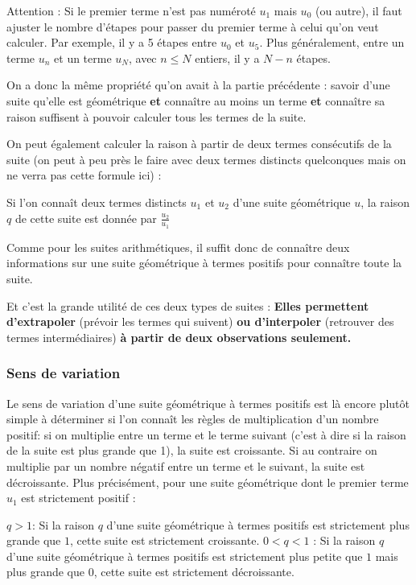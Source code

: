 \documentclass[10pt,a4paper]{book}
\begin{document}
\vspace{20 mm}

Attention : Si le premier terme n'est pas numéroté $u_1$ mais $u_0$ (ou autre), il faut ajuster le nombre d'étapes pour passer du premier terme à celui qu'on veut calculer.  Par exemple, il y a 5 étapes entre $u_0$ et $u_5$. Plus généralement, entre un terme $u_n$ et un terme $u_N$, avec $n \leq N$ entiers, il y a $N-n$ étapes.

On a donc la même propriété qu'on avait à la partie précédente : savoir d'une suite qu'elle est géométrique \textbf{et} connaître au moins un terme \textbf{et} connaître sa raison suffisent à pouvoir calculer tous les termes de la suite.

On peut également calculer la raison à partir de deux termes consécutifs de la suite  (on peut à peu près le faire avec deux termes distincts quelconques mais on ne verra pas cette formule ici) :


\begin{prop}
    Si l'on connaît deux termes distincts $u_1$ et $u_2$ d'une suite géométrique $u$, la raison $q$ de cette suite est donnée par $\frac{u_2}{u_1}$
\end{prop}

Comme pour les suites arithmétiques, il suffit donc de connaître deux informations sur une suite géométrique à termes positifs pour connaître toute la suite.

Et c'est la grande utilité de ces deux types de suites : \textbf{Elles permettent d'extrapoler} (prévoir les termes qui suivent) \textbf{ou d'interpoler} (retrouver des termes intermédiaires) \textbf{à partir de deux observations seulement.}

\subsubsection{Sens de variation}

Le sens de variation d'une suite géométrique à termes positifs est là encore plutôt simple à déterminer si l'on connaît les règles de multiplication d'un nombre positif: si on multiplie entre un terme et le terme suivant (c'est à dire si la raison de la suite est plus grande que 1), la suite est croissante. Si au contraire on multiplie par un nombre négatif entre un terme et le suivant, la suite est décroissante. Plus précisément, pour une suite géométrique dont le premier terme $u_1$ est strictement positif :

\begin{prop}
    $q>1$: Si la raison $q$ d'une suite géométrique à termes positifs est strictement plus grande que $1$, cette suite est strictement croissante.
    $0<q<1$ : Si la raison $q$ d'une suite géométrique à termes positifs  est strictement plus petite que $1$ mais plus grande que $0$, cette suite est strictement décroissante.
\end{prop}
\end{document}
